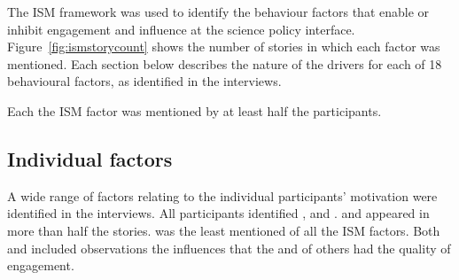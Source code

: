 

The ISM framework was used to identify the behaviour factors that enable or inhibit engagement and influence at the science policy interface. Figure~\ref{fig:ismstorycount} shows the number of stories in which each factor was mentioned. Each section below describes the nature of the drivers for each of 18 behavioural factors, as identified in the interviews.

Each the ISM factor was mentioned by at least half the participants.

\subsection{Individual factors}\label{sec:resindividual}

A wide range of factors relating to the individual participants' motivation were identified in the interviews. All participants identified \ismiv, \ismia{} and \ismis.  \ismiv{} and \ismia{} appeared in more than half the stories. \ismic{} was the least mentioned of all the ISM factors. Both \ismis{} and \ismih{} included observations the influences that the \ismis{} and \ismih{} of others had the quality of engagement.

\subsubsection{\ismiv}\label{sec:resismvalues}

